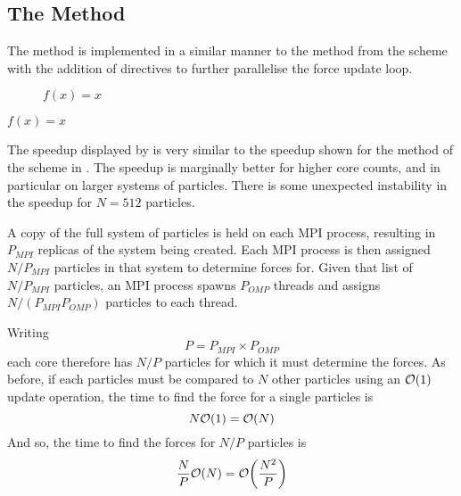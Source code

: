 \subsection{The \pairoperation{} Method}

The \pairoperation{} method is implemented in a similar manner to the
\pairoperation{} method from the \replicateddata{} scheme with the
addition of \openmp{} directives to further parallelise the
force update loop.

%

%
%
\begin{figure}[!h]
    
    \caption{
        \vZeroSpeedupCaption
            {\sharedandreplicateddata{}}
            {\pairoperation{}}
            {$f(x) = x$}
    }
    \label{fig:v1_shared_and_replicated_data_pair_operation_speedups}
\end{figure}


\vZeroSpeedupExplanation
    {}
    {\sharedandreplicateddata{}}
    {\pairoperation{}}
    {$f(x) = x$}

The speedup displayed by 
is very similar to the speedup shown for the \pairoperation{}
method of the \replicateddata{} scheme in
.
%
The speedup is marginally better for higher core counts, and in
particular on larger systems of particles.
%
There is some unexpected instability in the speedup for $N=512$ particles.


%
A copy of the full system of particles is held on each MPI process,
resulting in $P_{MPI}$ replicas of the system being created.
%
Each MPI process is then assigned $N/P_{MPI}$ particles in that system
to determine forces for.
%
Given that list of $N/P_{MPI}$ particles,
an MPI process spawns $P_{OMP}$ threads
and assigns $N/(P_{MPI} P_{OMP})$ particles to each thread.

Writing
\begin{equation}
    \label{eqn:p_eq_pmpi_pomp}
    P = P_{MPI} \times{} P_{OMP}
\end{equation}
each core therefore has $N/P$ particles
for which it must determine the forces.
%
As before, if each particles must be compared to $N$ other particles
using an $\mathcal{O}{\left({ 1 }\right)}$ update operation, the time to find the force for
a single particles is
\begin{equation}
    N\mathcal{O}{\left({ 1 }\right)} = \mathcal{O}{\left({ N }\right)}
\end{equation}
And so, the time to find the forces for $N/P$ particles is
\begin{equation}
    \label{eqn:shared_and_replicated_calculation_time}
    \frac{N}{P}\mathcal{O}{\left({ N }\right)} = \mathcal{O}{\left({ \frac{N^2}{P} }\right)}
\end{equation}

